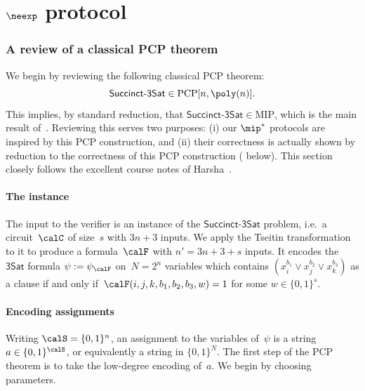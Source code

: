 \documentclass[11pt]{article}
\newcommand{\sat}{\mathsf{3Sat}}
\newcommand{\succinct}{\mathsf{Succinct}\text{-}\mathsf{3Sat}}
\begin{document}

\part{$\neexp$ protocol}

\label{part:neexp}


\section{A review of a classical PCP theorem}\label{sec:classical-pcp}

We begin \cref{part:neexp} by reviewing the following classical PCP theorem:
\begin{equation}
\succinct \in \mathrm{PCP}[n, \poly(n)].
\end{equation}
This implies, by standard reduction, that $\succinct \in \mathrm{MIP}$,
which is the main result of~\cite{BFL91}.
Reviewing this serves two purposes:
(i) our $\mip^*$ protocols are inspired by this PCP construction,
and (ii) their correctness is actually shown by reduction to the correctness of this PCP construction ( below).
This section closely follows the excellent course notes of Harsha~\cite{Har10}.

\subsection{The instance}

The input to the verifier is an instance of the $\succinct$ problem,
i.e.\ a circuit~$\calC$  of size~$s$ with $3n+3$ inputs.
We apply the Tseitin transformation to it to produce a formula~$\calF$ with $n' = 3n+3+s$ inputs.
It encodes the $\sat$ formula $\psi := \psi_{\calF}$ on~$N = 2^n$ variables
which contains $(x_i^{b_1} \lor x_j^{b_2} \lor x_k^{b_3})$ 
as a clause
if and only if~$\calF(i, j, k, b_1, b_2, b_3, w) = 1$ for some $w \in \{0, 1\}^s$.

\subsection{Encoding assignments}

Writing $\calS = \{0, 1\}^n$, an assignment to the variables of~$\psi$ is a string $a \in \{0,1\}^{\calS}$, or equivalently a string in $\{0, 1\}^N$.
The first step of the PCP theorem is to take the low-degree encoding of~$a$.
We begin by choosing parameters.
\end{document}
